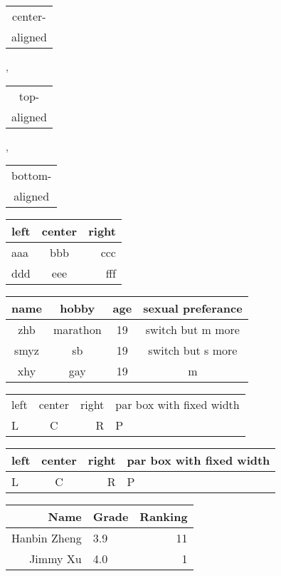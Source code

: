 \documentclass{article}
\begin{document}
\begin{tabular}{|c|}
center-\\ aligned \\
\end{tabular},
\begin{tabular}[t]{|c|}
top-\\ aligned \\
\end{tabular},
\begin{tabular}[b]{|c|}
bottom-\\ aligned\\
\end{tabular}

\begin{tabular}{|l|c|r|}
\hline
left & center & right \\
\hline
aaa & bbb & ccc \\
ddd & eee & fff \\
\hline
\end{tabular}

\begin{tabular}{|c|c|c|c|}
\hline
name & hobby & age & sexual preferance \\
\hline
zhb & marathon & 19 & switch but m more \\
\hline
smyz & sb & 19 & switch but s more \\
\hline
xhy & gay & 19 & m \\
\hline
\end{tabular}

\par

\begin{tabular}{lcr|p{6em}}
\hline
left & center & right
& par box with fixed width\\
L & C & R & P \\
\hline
\end{tabular}

\par

\begin{tabular}{lcr|p{10em}}
\hline
left & center & right
& par box with fixed width \\
\hline
L & C & R & P \\
\hline
\end{tabular}

\begin{tabular}{|@{} r@{:\quad} l r@{}|}
\hline
Name & Grade & Ranking \\
\hline
Hanbin Zheng & 3.9 & 11 \\
\hline
Jimmy Xu & 4.0 & 1 \\
\hline
\end{tabular}
\end{document}
